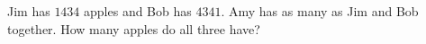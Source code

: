 Jim has $1434$ apples and Bob has $4341$. Amy has as many as Jim and Bob together. How many apples do all three have?
